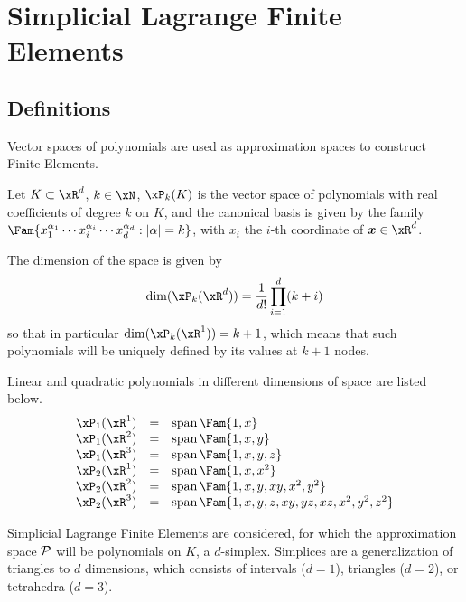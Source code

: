 
\chapter{Simplicial Lagrange Finite Elements}\label{sec:lagrange}

\section{Definitions}

Vector spaces of polynomials are used as approximation spaces to construct Finite Elements.

\begin{dfntn}
Let $K\subset \xR^d$, $k \in \xN$, $\xP_k(K)$ is the vector space of polynomials with real coefficients of degree $k$ on $K$, and the canonical basis is given by the family $\Fam{ x_1^{\alpha_1}\cdots x_i^{\alpha_i}\cdots x_d^{\alpha_d} : |\alpha| = k }$, with $x_i$ the $i$-th coordinate of $\xx\in\xR^d$.
\end{dfntn}

The dimension of the space is given by
\begin{equation*}
\dim(\xP_k(\xR^d)) = \frac{1}{d!} \prod_{i=1}^d (k + i)
\end{equation*}
so that in particular $\dim(\xP_k(\xR^1)) = k + 1$, which means that such polynomials will be uniquely defined by its values at $k+1$ nodes.

\begin{xmpl}
Linear and quadratic polynomials in different dimensions of space are listed below.
\begin{equation*}
\begin{array}{lcl}
\xPone(\xR^1) &=& \Span\Fam{ 1, x } \\
\xPone(\xR^2) &=& \Span\Fam{ 1, x, y } \\
\xPone(\xR^3) &=& \Span\Fam{ 1, x, y, z } \\
\xPtwo(\xR^1) &=& \Span\Fam{ 1, x, x^2 } \\
\xPtwo(\xR^2) &=& \Span\Fam{ 1, x, y, xy, x^2, y^2 } \\
\xPtwo(\xR^3) &=& \Span\Fam{ 1, x, y, z, xy, yz, xz, x^2, y^2, z^2 }
\end{array}
\end{equation*}
\end{xmpl}

Simplicial Lagrange Finite Elements are considered, for which the approximation space ${\mathcal P}$ will be polynomials on $K$, a $d$-simplex.
Simplices are a generalization of triangles to $d$ dimensions, which consists of intervals ($d=1$), triangles ($d=2$), or tetrahedra ($d=3$).

